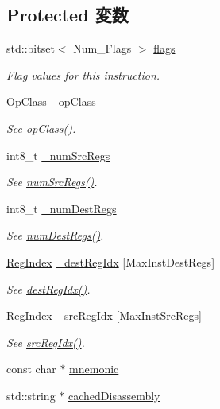 \subsection*{Protected 変数}
\begin{DoxyCompactItemize}
\item 
std::bitset$<$ Num\_\-Flags $>$ \hyperlink{classStaticInst_a0bf9c8a3dba6ab3f4a4b1bee48ebd0be}{flags}
\begin{DoxyCompactList}\small\item\em Flag values for this instruction. \item\end{DoxyCompactList}\item 
OpClass \hyperlink{classStaticInst_a4108a1bc5570a7db48a6ab73d0a636d0}{\_\-opClass}
\begin{DoxyCompactList}\small\item\em See \hyperlink{classStaticInst_aa4919f97cae20d4d82391c1fc6d5fda6}{opClass()}. \item\end{DoxyCompactList}\item 
int8\_\-t \hyperlink{classStaticInst_ad7220cef5373cc7d1be744c59cdb7f81}{\_\-numSrcRegs}
\begin{DoxyCompactList}\small\item\em See \hyperlink{classStaticInst_a3902ecc708a6f28e94ee9aa975692915}{numSrcRegs()}. \item\end{DoxyCompactList}\item 
int8\_\-t \hyperlink{classStaticInst_ad6de38545e1fa5e1883b18cc0c69f891}{\_\-numDestRegs}
\begin{DoxyCompactList}\small\item\em See \hyperlink{classStaticInst_ab7e23352b3d45a982dfeb799030f87d0}{numDestRegs()}. \item\end{DoxyCompactList}\item 
\hyperlink{classStaticInst_a36d25e03e43fa3bb4c5482cbefe5e0fb}{RegIndex} \hyperlink{classStaticInst_a157015ade233f4258d3fc3a4febb14f8}{\_\-destRegIdx} \mbox{[}MaxInstDestRegs\mbox{]}
\begin{DoxyCompactList}\small\item\em See \hyperlink{classStaticInst_ae5a1a6d72f40f715253b91e32b3caad2}{destRegIdx()}. \item\end{DoxyCompactList}\item 
\hyperlink{classStaticInst_a36d25e03e43fa3bb4c5482cbefe5e0fb}{RegIndex} \hyperlink{classStaticInst_aa053ba73e4ceeefc0fca46c6791e6a53}{\_\-srcRegIdx} \mbox{[}MaxInstSrcRegs\mbox{]}
\begin{DoxyCompactList}\small\item\em See \hyperlink{classStaticInst_a9353aea3dfe673b88a4a96163d58759f}{srcRegIdx()}. \item\end{DoxyCompactList}\item 
const char $\ast$ \hyperlink{classStaticInst_adfacb526b8ab378bf36f1324303635d0}{mnemonic}
\item 
std::string $\ast$ \hyperlink{classStaticInst_aca407a93c3360ff06d5d52f92583a6e1}{cachedDisassembly}
\end{DoxyCompactItemize}
